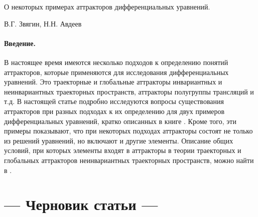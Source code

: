 




О некоторых примерах аттракторов дифференциальных уравнений.

                                   В.Г. Звягин, Н.Н. Авдеев

\paragraph{Введение.}
В настоящее время имеются несколько подходов к определению понятий аттракторов,
которые применяются для исследования дифференциальных уравнений.
Это траекторные и глобальные аттракторы инвариантных и неинвариантных траекторных пространств,
аттракторы полугруппы трансляций и т.д.
В настоящей статье подробно исследуются вопросы существования аттракторов
при разных подходах к их определению для двух примеров дифференциальных уравнений,
кратко описанных в книге \cite{Vorotnikov}.
Кроме того, эти примеры показывают, что при некоторых подходах аттракторы состоят не только из решений уравнений,
но включают и другие элементы.
Описание общих условий,
при которых элементы входят в аттракторы в теории траекторных и глобальных аттракторов неинвариантных траекторных пространств,
можно найти в \cite{Kondratyev}.

\section*{--- Черновик статьи ---}




